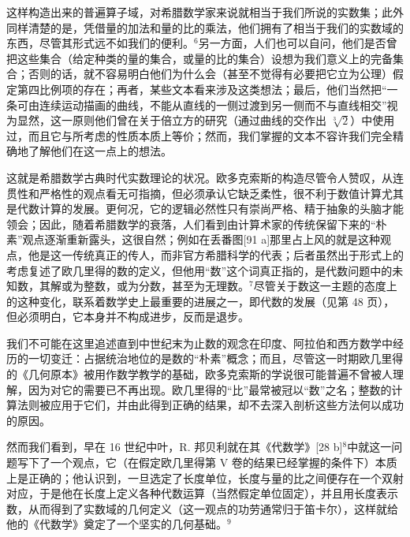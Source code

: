 这样构造出来的普遍算子域，对希腊数学家来说就相当于我们所说的实数集；此外同样清楚的是，凭借量的加法和量的比的乘法，他们拥有了相当于我们的实数域的东西，尽管其形式远不如我们的便利。\(^{6}\)另一方面，人们也可以自问，他们是否曾把这些集合（给定种类的量的集合，或量的比的集合）设想为我们意义上的完备集合；否则的话，就不容易明白他们为什么会（甚至不觉得有必要把它立为公理）假定第四比例项的存在；再者，某些文本看来涉及这类想法；最后，他们当然把“一条可由连续运动描画的曲线，不能从直线的一侧过渡到另一侧而不与直线相交”视为显然，这一原则他们曾在关于倍立方的研究（通过曲线的交作出 \(\sqrt[3]{2}\)）中使用过，而且它与所考虑的性质本质上等价；然而，我们掌握的文本不容许我们完全精确地了解他们在这一点上的想法。

这就是希腊数学古典时代实数理论的状况。欧多克索斯的构造尽管令人赞叹，从连贯性和严格性的观点看无可指摘，但必须承认它缺乏柔性，很不利于数值计算尤其是代数计算的发展。更何况，它的逻辑必然性只有崇尚严格、精于抽象的头脑才能领会；因此，随着希腊数学的衰落，人们看到由计算术家的传统保留下来的“朴素”观点逐渐重新露头，这很自然；例如在丢番图{[}91 a{]}那里占上风的就是这种观点，他是这一传统真正的传人，而非官方希腊科学的代表；后者虽然出于形式上的考虑复述了欧几里得的数的定义，但他用“数”这个词真正指的，是代数问题中的未知数，其解或为整数，或为分数，甚至为无理数。\(^{7}\)尽管关于数这一主题的态度上的这种变化，联系着数学史上最重要的进展之一，即代数的发展（见第 48 页），但必须明白，它本身并不构成进步，反而是退步。

我们不可能在这里追述直到中世纪末为止数的观念在印度、阿拉伯和西方数学中经历的一切变迁：占据统治地位的是数的“朴素”概念；而且，尽管这一时期欧几里得的《几何原本》被用作数学教学的基础，欧多克索斯的学说很可能普遍不曾被人理解，因为对它的需要已不再出现。欧几里得的“比”最常被冠以“数”之名；整数的计算法则被应用于它们，并由此得到正确的结果，却不去深入剖析这些方法何以成功的原因。

然而我们看到，早在 16 世纪中叶，R. 邦贝利就在其《代数学》{[}28 b{]}\(^{8}\)中就这一问题写下了一个观点，它（在假定欧几里得第 V 卷的结果已经掌握的条件下）本质上是正确的；他认识到，一旦选定了长度单位，长度与量的比之间便存在一个双射对应，于是他在长度上定义各种代数运算（当然假定单位固定），并且用长度表示数，从而得到了实数域的几何定义（这一观点的功劳通常归于笛卡尔），这样就给他的《代数学》奠定了一个坚实的几何基础。\(^{9}\)

